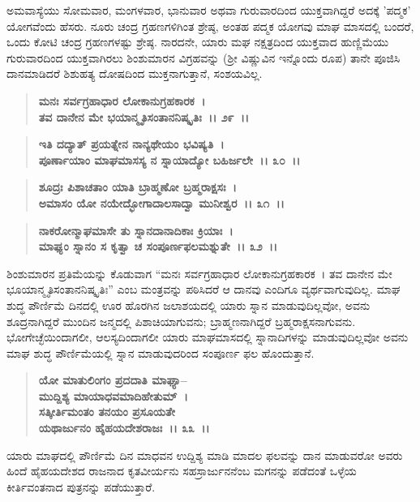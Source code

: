ಅಮವಾಸ್ಯೆಯು ಸೋಮವಾರ, ಮಂಗಳವಾರ, ಭಾನುವಾರ ಅಥವಾ ಗುರುವಾರದಿಂದ ಯುಕ್ತವಾಗಿದ್ದರೆ ಅದಕ್ಕೆ 'ಪದ್ಮಕ' ಯೋಗವೆಂದು ಹೆಸರು. ನೂರು ಚಂದ್ರ ಗ್ರಹಣಗಳಿಗಿಂತ ಶ್ರೇಷ್ಠ, ಅಂತಹ ಪದ್ಮಕ ಯೋಗವು ಮಾಘ ಮಾಸದಲ್ಲಿ ಬಂದರೆ, ಒಂದು ಕೋಟಿ ಚಂದ್ರ ಗ್ರಹಣಗಳಷ್ಟು ಶ್ರೇಷ್ಠ. ನಾರದನೇ, ಯಾರು ಮಘ ನಕ್ಷತ್ರದಿಂದ ಯುಕ್ತವಾದ ಹುಣ್ಣಿಮೆಯು ಗುರುವಾರದಿಂದ ಯುಕ್ತವಾಗಿರಲು ಶಿಂಶುಮಾರನ ವಿಗ್ರಹವನ್ನು (ಶ‍್ರೀ ವಿಷ್ಣುವಿನ ಇನ್ನೊಂದು ರೂಪ) ತಾನೇ ಪೂಜಿಸಿ ದಾನಮಾಡಿದರೆ ಶಿಶುಹತ್ಯ ದೋಷದಿಂದ ಮುಕ್ತನಾಗುತ್ತಾನೆ, ಸಂಶಯವಿಲ್ಲ.

\begin{verse}
\textbf{ಮನಃ ಸರ್ವಗ್ರಹಾಧಾರ ಲೋಕಾನುಗ್ರಹಕಾರಕ~।}\\\textbf{ತವ ದಾನೇನ ಮೇ ಭಯಾನ್ಮೃತಿಸಂತಾನನಿಷ್ಕೃತಿಃ~।। ೨೯~।। }
\end{verse}

\begin{verse}
\textbf{ಇತಿ ದದ್ಯಾತ್ ಪ್ರಯತ್ನೇನ ನಾನ್ಯಥೇಯಂ ಭವಿಷ್ಯತಿ~।}\\\textbf{ಪೂರ್ಣಾಯಾಂ ಮಾಘಮಾಸಸ್ಯ ನ ಸ್ನಾಯಾದ್ಯೋ ಬಹಿರ್ಜಲೇ~।। ೩೦~।। }
\end{verse}

\begin{verse}
\textbf{ಶೂದ್ರಃ ಪಿಶಾಚತಾಂ ಯಾತಿ ಬ್ರಾಹ್ಮಣೋ ಬ್ರಹ್ಮರಾಕ್ಷಸಃ~।}\\\textbf{ಅಮಾಸಂ ಯೋ ನಯೇದ್ಭೋಗಾದಾಲಸಾದ್ವಾ ಮುನೀಶ್ವರ~।। ೩೧~।।} 
\end{verse}

\begin{verse}
\textbf{ನಾಕರೋನ್ಮಾಘಮಾಸೇ ತು ಸ್ನಾನದಾನಾದಿಕಾಃ ಕ್ರಿಯಾಃ~।}\\\textbf{ಮಾಘ್ಯಂ ಸ್ನಾನಂ ಸ ಕೃತ್ವಾ ಚ ಸಂಪೂರ್ಣಫಲಮಶ್ನುತೇ~।। ೩೨~।।}
\end{verse}

ಶಿಂಶುಮಾರನ ಪ್ರತಿಮೆಯನ್ನು ಕೊಡುವಾಗ “ಮನಃ ಸರ್ವಗ್ರಹಾಧಾರ ಲೋಕಾನುಗ್ರಹಕಾರಕ~। ತವ ದಾನೇನ ಮೇ ಭೂಯಾನ್ಮೃತಿಸಂತಾನನಿಷ್ಕೃತಿಃ” ಎಂಬ ಮಂತ್ರವನ್ನು ಪಠಿಸಿದರೆ ಆ ದಾನವು ಎಂದಿಗೂ ವ್ಯರ್ಥವಾಗುವುದಿಲ್ಲ. ಮಾಘ ಶುದ್ಧ ಪೌರ್ಣಿಮೆ ದಿನದಲ್ಲಿ ಊರ ಹೊರಗಿನ ಜಲಾಶಯದಲ್ಲಿ ಯಾರು ಸ್ನಾನ ಮಾಡುವುದಿಲ್ಲವೋ, ಅವನು ಶೂದ್ರನಾಗಿದ್ದರೆ ಮುಂದಿನ ಜನ್ಮದಲ್ಲಿ ಪಿಶಾಚಿಯಾಗುವನು; ಬ್ರಾಹ್ಮಣನಾಗಿದ್ದರೆ ಬ್ರಹ್ಮರಾಕ್ಷಸನಾಗುವನು. ಭೋಗೇಚ್ಛೆಯಿಂದಾಗಲೀ, ಆಲಸ್ಯದಿಂದಾಗಲೀ ಯಾರು ಮಾಘಮಾಸದಲ್ಲಿ ಸ್ನಾನಾದಿಗಳನ್ನು ಮಾಡುವುದಿಲ್ಲವೋ ಅವನು ಮಾಘ ಶುದ್ಧ ಪೌರ್ಣಿಮೆಯಲ್ಲಿ ಸ್ನಾನ ಮಾಡುವುದರಿಂದ ಸಂಪೂರ್ಣ ಫಲ ಹೊಂದುತ್ತಾನೆ.

\begin{verse}
\textbf{ಯೋ ಮಾತುಲಿಂಗಂ ಪ್ರದದಾತಿ ಮಾಘ್ಯಾ–}\\\textbf{ಮುದ್ದಿಶ್ಯ ಮಾಯಾಧವಮಾದಿಹೇತುಮ್~।}\\\textbf{ಸತ್ಕೀರ್ತಿಮಂತಂ ತನಯಂ ಪ್ರಸೂಯತೇ} \\\textbf{ಯಥಾರ್ಜುನಂ ಹೈಹಯದೇಶರಾಜಃ~।। ೩೩~।।}
\end{verse}

ಯಾರು ಮಾಘದಲ್ಲಿ ಪೌರ್ಣಿಮೆ ದಿನ ಮಾಧವನ ಉದ್ದಿಶ್ಯ ಮಾಡಿ ಮಾದಲ ಫಲವನ್ನು ದಾನ ಮಾಡುವರೋ ಅವರು ಹಿಂದೆ ಹೈಹಯದೇಶದ ರಾಜನಾದ ಕೃತವೀರ್ಯನು ಸಹಸ್ರಾರ್ಜುನನೆಂಬ ಮಗನನ್ನು ಪಡೆದಂತೆ ಒಳ್ಳೆಯ ಕೀರ್ತಿವಂತನಾದ ಪುತ್ರನನ್ನು ಪಡೆಯುತ್ತಾರೆ.

